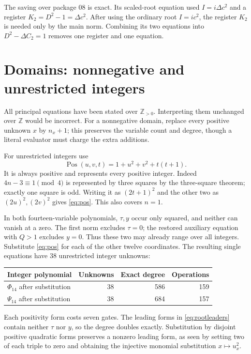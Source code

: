 \documentclass[11pt,a4paper]{article}
\theoremstyle{remark}\newtheorem{remark}[theorem]{Remark}
\newcommand{\Z}{\mathbb Z}
\newcommand{\Pos}{\mathbb Z_{>0}}
\begin{document}
The saving over package 08 is exact. Its scaled-root equation used
\(I=i\Delta c^2\) and a register \(K_2=D^2-1=\Delta c^2\).
After using the ordinary root \(I=ic^2\), the register \(K_2\) is
needed only by the main norm. Combining its two equations into
\(D^2-\Delta C_2=1\) removes one register and one equation.

\section{Domains: nonnegative and unrestricted integers}\label{sec:domains}
All principal equations have been stated over \(\Pos\). Interpreting
them unchanged over \(\Z\) would be incorrect. For a nonnegative
domain, replace every positive unknown \(x\) by \(n_x+1\);
this preserves the variable count and degree, though a literal evaluator
must charge the extra additions.

For unrestricted integers use
\begin{equation}
 \operatorname{Pos}(u,v,t)=1+u^2+v^2+t(t+1).\label{eq:pos}
\end{equation}
It is always positive and represents every positive integer. Indeed
\(4n-3\equiv1\pmod4\) is represented by three squares by the
three-square theorem; exactly one square is odd. Writing it as
\((2t+1)^2\) and the other two as \((2u)^2,(2v)^2\) gives
\eqref{eq:pos}. This also covers \(n=1\).

In both fourteen-variable polynomials, \(\tau,y\) occur only squared,
and neither can vanish at a zero. The first norm excludes \(\tau=0\);
the restored auxiliary equation with \(Q>1\) excludes \(y=0\).
Thus these two may already range over all integers. Substitute
\eqref{eq:pos} for each of the other twelve coordinates. The resulting
single equations have 38 unrestricted integer unknowns:
\begin{center}\small
\begin{tabular}{lrrr}
\toprule
Integer polynomial & Unknowns & Exact degree & Operations\\
\midrule
\(\Phi_{14}\) after substitution & 38 & 586 & 159\\
\(\Psi_{14}\) after substitution & 38 & 684 & 157\\
\bottomrule
\end{tabular}
\end{center}
Each positivity form costs seven gates. The leading forms in
\eqref{eq:rootleaders} contain neither \(\tau\) nor \(y\), so the
degree doubles exactly. Substitution by disjoint positive quadratic
forms preserves a nonzero leading form, as seen by setting two of each
triple to zero and obtaining the injective monomial substitution
\(x\mapsto u_x^2\).
\end{document}
